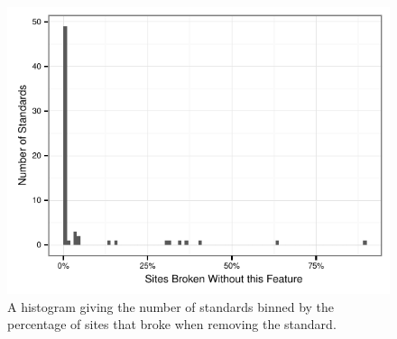 \begin{figure}[ht]
  \centering
  \includegraphics[width=.5\textwidth]{figures/breakrate_histogram.pdf}
  \caption{A histogram giving the number of standards binned by the percentage of sites that broke when removing the standard.}
  \label{fig:feature-benefit}
\end{figure}
